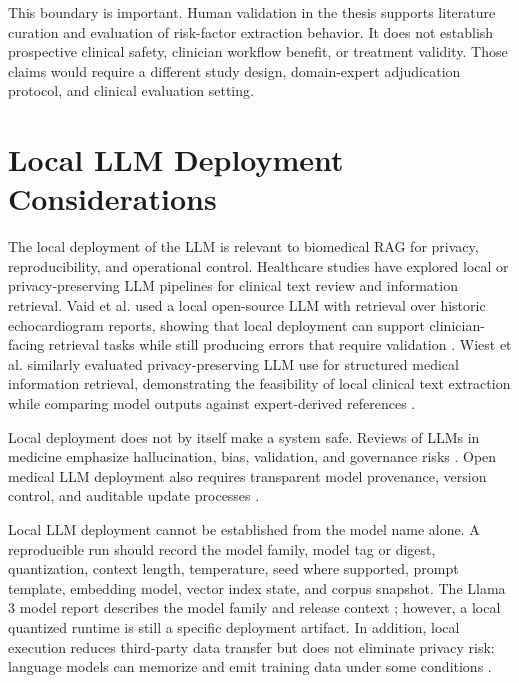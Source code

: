 This boundary is important. Human validation in the thesis supports literature curation and evaluation of risk-factor extraction behavior. It does not establish prospective clinical safety, clinician workflow benefit, or treatment validity. Those claims would require a different study design, domain-expert adjudication protocol, and clinical evaluation setting.

\section{Local LLM Deployment Considerations}

The local deployment of the LLM is relevant to biomedical RAG for privacy, reproducibility, and operational control. Healthcare studies have explored local or privacy-preserving LLM pipelines for clinical text review and information retrieval. Vaid et al. used a local open-source LLM with retrieval over historic echocardiogram reports, showing that local deployment can support clinician-facing retrieval tasks while still producing errors that require validation \cite{vaid2024local}. Wiest et al. similarly evaluated privacy-preserving LLM use for structured medical information retrieval, demonstrating the feasibility of local clinical text extraction while comparing model outputs against expert-derived references \cite{wiest2024privacyllm}.

Local deployment does not by itself make a system safe. Reviews of LLMs in medicine emphasize hallucination, bias, validation, and governance risks \cite{thirunavukarasu2023llmmedicine}. Open medical LLM deployment also requires transparent model provenance, version control, and auditable update processes \cite{riedemann2024openmedicine}.

Local LLM deployment cannot be established from the model name alone. A reproducible run should record the model family, model tag or digest, quantization, context length, temperature, seed where supported, prompt template, embedding model, vector index state, and corpus snapshot. The Llama 3 model report describes the model family and release context \cite{dubey2024llama3}; however, a local quantized runtime is still a specific deployment artifact. In addition, local execution reduces third-party data transfer but does not eliminate privacy risk: language models can memorize and emit training data under some conditions \cite{carlini2021extracting}.

